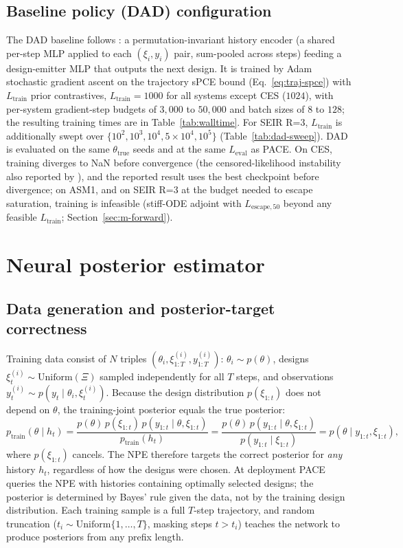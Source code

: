 \section{Baseline policy (DAD) configuration}
The DAD baseline follows \citet{foster2021deep}: a permutation-invariant history encoder
(a shared per-step MLP applied to each $(\xi_i,y_i)$ pair, sum-pooled across steps)
feeding a design-emitter MLP that outputs the next design. It is trained by Adam
stochastic gradient ascent on the trajectory sPCE bound (Eq.~\eqref{eq:traj-spce}) with
$L_{\mathrm{train}}$ prior contrastives, $L_{\mathrm{train}}=1000$ for all systems except
CES ($1024$), with per-system gradient-step budgets of $3{,}000$ to $50{,}000$ and batch
sizes of $8$ to $128$; the resulting training times are in Table~\ref{tab:walltime}. For
SEIR R=3, $L_{\mathrm{train}}$ is additionally swept over
$\{10^2,10^3,10^4,5{\times}10^4,10^5\}$ (Table~\ref{tab:dad-sweep}). DAD is evaluated on
the same $\theta_{\mathrm{true}}$ seeds and at the same $L_{\mathrm{eval}}$ as PACE. On
CES, training diverges to NaN before convergence (the censored-likelihood instability
also reported by \citet{hedman2025stepdad}), and the reported result uses the best
checkpoint before divergence; on ASM1, and on SEIR R=3 at the budget needed to escape
saturation, training is infeasible (stiff-ODE adjoint with
$L_{\mathrm{escape},50}$ beyond any feasible $L_{\mathrm{train}}$;
Section~\ref{sec:m-forward}).

\chapter{Neural posterior estimator}
\label{app:npe}

\section{Data generation and posterior-target correctness}
Training data consist of $N$ triples $(\theta_i,\xi^{(i)}_{1:T},y^{(i)}_{1:T})$:
$\theta_i\sim p(\theta)$, designs $\xi^{(i)}_t\sim\mathrm{Uniform}(\Xi)$ sampled
independently for all $T$ steps, and observations
$y^{(i)}_t\sim p(y_t\mid\theta_i,\xi^{(i)}_t)$. Because the design distribution
$p(\xi_{1:t})$ does not depend on $\theta$, the training-joint posterior equals the
true posterior:
\begin{equation}
\label{eq:npe-correct}
p_{\mathrm{train}}(\theta\mid h_t)
= \frac{p(\theta)\,p(\xi_{1:t})\,p(y_{1:t}\mid\theta,\xi_{1:t})}{p_{\mathrm{train}}(h_t)}
= \frac{p(\theta)\,p(y_{1:t}\mid\theta,\xi_{1:t})}{p(y_{1:t}\mid\xi_{1:t})}
= p(\theta\mid y_{1:t},\xi_{1:t}),
\end{equation}
where $p(\xi_{1:t})$ cancels. The NPE therefore targets the correct posterior for
\emph{any} history $h_t$, regardless of how the designs were chosen. At deployment PACE
queries the NPE with histories containing optimally selected designs; the posterior is
determined by Bayes' rule given the data, not by the training design distribution. Each
training sample is a full $T$-step trajectory, and random truncation
($t_i\sim\mathrm{Uniform}\{1,\dots,T\}$, masking steps $t>t_i$) teaches the network to
produce posteriors from any prefix length.

